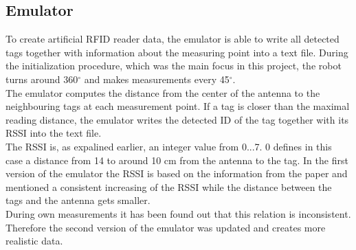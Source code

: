 \subsection{Emulator}
To create artificial RFID reader data, the emulator is able to write all detected tags together with information about the measuring point into a text file. During the initialization procedure, which was the main focus in this project, the robot turns around 360$^\circ$ and makes measurements every 45$^\circ$. \\
The emulator computes the distance from the center of the antenna to the neighbouring tags at each measurement point. If a tag is closer than the maximal reading distance, the emulator writes the detected ID of the tag together with its RSSI into the text file. \\
The RSSI is, as expalined earlier, an integer value from 0...7. 0 defines in this case a distance from 14 to around 10 cm from the antenna to the tag. In the first version of the emulator the RSSI is based on the information from the paper \cite{ChristofRohrigDanielHessandFrankKunemund.} and mentioned a consistent increasing of the RSSI while the distance between the tags and the antenna gets smaller. \\
During own measurements it has been found out that this relation is inconsistent. Therefore the second version of the emulator was updated and creates more realistic data.\\

